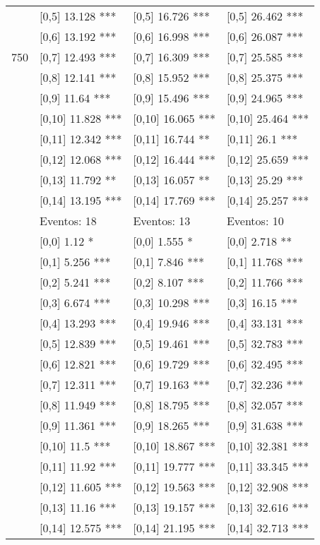 \begin{table}
\begin{tabular}[t]{llll}
 & {}[0,5] 13.128 *** & {}[0,5] 16.726 *** & {}[0,5] 26.462 ***\\
 & {}[0,6] 13.192 *** & {}[0,6] 16.998 *** & {}[0,6] 26.087 ***\\
750 & {}[0,7] 12.493 *** & {}[0,7] 16.309 *** & {}[0,7] 25.585 ***\\
\addlinespace
 & {}[0,8] 12.141 *** & {}[0,8] 15.952 *** & {}[0,8] 25.375 ***\\
 & {}[0,9] 11.64 *** & {}[0,9] 15.496 *** & {}[0,9] 24.965 ***\\
 & {}[0,10] 11.828 *** & {}[0,10] 16.065 *** & {}[0,10] 25.464 ***\\
 & {}[0,11] 12.342 *** & {}[0,11] 16.744 ** & {}[0,11] 26.1 ***\\
 & {}[0,12] 12.068 *** & {}[0,12] 16.444 *** & {}[0,12] 25.659 ***\\
\addlinespace
 & {}[0,13] 11.792 ** & {}[0,13] 16.057 ** & {}[0,13] 25.29 ***\\
 & {}[0,14] 13.195 *** & {}[0,14] 17.769 *** & {}[0,14] 25.257 ***\\
 & Eventos:  18 & Eventos:  13 & Eventos:  10\\
 & {}[0,0] 1.12 * & {}[0,0] 1.555 * & {}[0,0] 2.718 **\\
 & {}[0,1] 5.256 *** & {}[0,1] 7.846 *** & {}[0,1] 11.768 ***\\
\addlinespace
 & {}[0,2] 5.241 *** & {}[0,2] 8.107 *** & {}[0,2] 11.766 ***\\
 & {}[0,3] 6.674 *** & {}[0,3] 10.298 *** & {}[0,3] 16.15 ***\\
 & {}[0,4] 13.293 *** & {}[0,4] 19.946 *** & {}[0,4] 33.131 ***\\
 & {}[0,5] 12.839 *** & {}[0,5] 19.461 *** & {}[0,5] 32.783 ***\\
 & {}[0,6] 12.821 *** & {}[0,6] 19.729 *** & {}[0,6] 32.495 ***\\
\addlinespace
1000 & {}[0,7] 12.311 *** & {}[0,7] 19.163 *** & {}[0,7] 32.236 ***\\
 & {}[0,8] 11.949 *** & {}[0,8] 18.795 *** & {}[0,8] 32.057 ***\\
 & {}[0,9] 11.361 *** & {}[0,9] 18.265 *** & {}[0,9] 31.638 ***\\
 & {}[0,10] 11.5 *** & {}[0,10] 18.867 *** & {}[0,10] 32.381 ***\\
 & {}[0,11] 11.92 *** & {}[0,11] 19.777 *** & {}[0,11] 33.345 ***\\
\addlinespace
 & {}[0,12] 11.605 *** & {}[0,12] 19.563 *** & {}[0,12] 32.908 ***\\
 & {}[0,13] 11.16 *** & {}[0,13] 19.157 *** & {}[0,13] 32.616 ***\\
 & {}[0,14] 12.575 *** & {}[0,14] 21.195 *** & {}[0,14] 32.713 ***\\
\bottomrule
\end{tabular}
\end{table}
